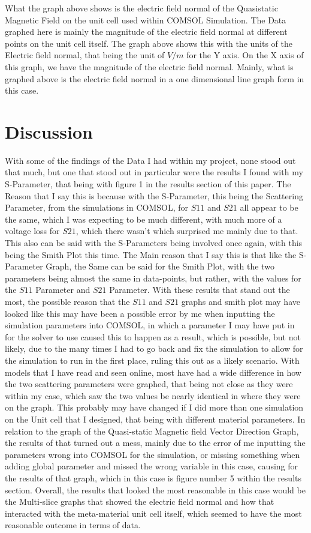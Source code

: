 \documentclass[]{article}
\begin{document}
\noindent
What the graph above shows is the electric field normal of the Quasistatic Magnetic Field on the unit cell used within COMSOL Simulation. The Data graphed here is mainly the magnitude of the electric field normal at different points on the unit cell itself. The graph above shows this with the units of the Electric field normal, that being the unit of $V/m$ for the Y axis. On the X axis of this graph, we have the magnitude of the electric field normal. Mainly, what is graphed above is the electric field normal in a one dimensional line graph form in this case. 
\section*{Discussion}
With some of the findings of the Data I had within my project, none stood out that much, but one that stood out in particular were the results I found with my S-Parameter, that being with figure 1 in the results section of this paper. The Reason that I say this is because with the S-Parameter, this being the Scattering Parameter, from the simulations in COMSOL, for $S11$ and $S21$ all appear to be the same, which I was expecting to be much different, with much more of a voltage loss for $S21$, which there wasn't which surprised me mainly due to that. This also can be said with the S-Parameters being involved once again, with this being the Smith Plot this time. The Main reason that I say this is that like the S-Parameter Graph, the Same can be said for the Smith Plot, with the two parameters being almost the same in data-points, but rather, with the values for the $S11$ Parameter and $S21$ Parameter. With these results that stand out the most, the possible reason that the $S11$ and $S21$ graphs and smith plot may have looked like this may have been a possible error by me when inputting the simulation parameters into COMSOL, in which a parameter I may have put in for the solver to use caused this to happen as a result, which is possible, but not likely, due to the many times I had to go back and fix the simulation to allow for the simulation to run in the first place, ruling this out as a likely scenario. With models that I have read and seen online, most have had a wide difference in how the two scattering parameters were graphed, that being not close as they were within my case, which saw the two values be nearly identical in where they were on the graph. This probably may have changed if I did more than one simulation on the Unit cell that I designed, that being with different material parameters. In relation to the graph of the Quasi-static Magnetic field Vector Direction Graph, the results of that turned out a mess, mainly due to the error of me inputting the parameters wrong into COMSOL for the simulation, or missing something when adding global parameter and missed the wrong variable in this case, causing for the results of that graph, which in this case is figure number 5 within the results section. Overall, the results that looked the most reasonable in this case would be the Multi-slice graphs that showed the electric field normal and how that interacted with the meta-material unit cell itself, which seemed to have the most reasonable outcome in terms of data.
\end{document}
